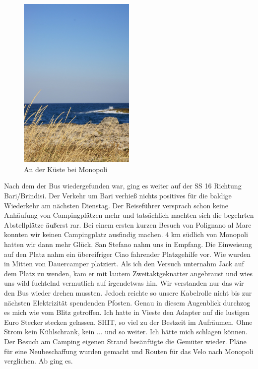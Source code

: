 \begin{figure}[H]
    \centering
    \includegraphics[width=0.5\textwidth]{../Bilder/Sommer2012/43.jpg}
    \caption{An der Küste bei Monopoli}
    \label{img:Sommer5}
\end{figure}

Nach dem der Bus wiedergefunden war, ging es weiter auf der SS 16 Richtung Bari/Brindisi.
Der Verkehr um Bari verhieß nichts positives für die baldige Wiederkehr am nächsten Dienstag.
Der Reiseführer versprach schon keine Anhäufung von Campingplätzen mehr und tatsächlich machten sich die begehrten Abstellplätze äußerst rar.
Bei einem ersten kurzen Besuch von Polignano al Mare konnten wir keinen Campingplatz ausfindig machen.
4 km südlich von Monopoli hatten wir dann mehr Glück.
San Stefano nahm uns in Empfang.
Die Einweisung auf den Platz nahm ein übereifriger Ciao fahrender Platzgehilfe vor.
Wie wurden in Mitten von Dauercamper platziert.
Als ich den Versuch unternahm Jack auf dem Platz zu wenden, kam er mit lautem Zweitaktgeknatter angebraust und wies uns wild fuchtelnd vermutlich auf irgendetwas hin.
Wir verstanden nur das wir den Bus wieder drehen mussten.
Jedoch reichte so unsere Kabelrolle nicht bis zur nächsten Elektrizität spendenden Pfosten.
Genau in diesem Augenblick durchzog es mich wie vom Blitz getroffen.
Ich hatte in Vieste den Adapter auf die lustigen Euro Stecker stecken gelassen.
SHIT, so viel zu der Bestzeit im Aufräumen.
Ohne Strom kein Kühlschrank, kein
... und so weiter.
Ich hätte mich schlagen können.
Der Besuch am Camping eigenen Strand besänftigte die Gemüter wieder.
Pläne für eine Neubeschaffung wurden gemacht und Routen für das Velo nach Monopoli verglichen.
Ab ging es.

